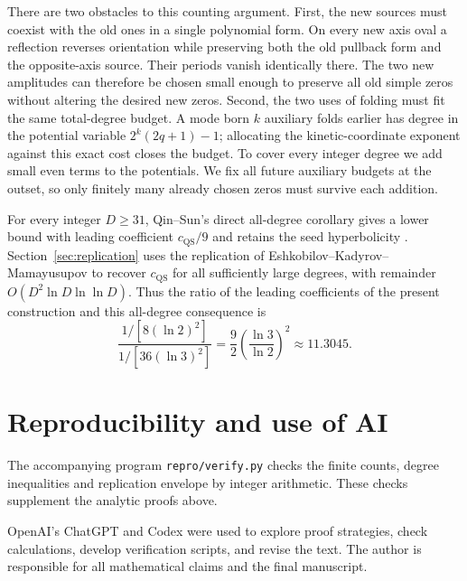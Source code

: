 \documentclass[11pt]{article}
\numberwithin{equation}{section}
\theoremstyle{definition}
\theoremstyle{remark}
\begin{document}
There are two obstacles to this counting argument. First, the new sources
must coexist with the old ones in a single polynomial form. On every
new axis oval a reflection reverses orientation while preserving both
the old pullback form and the opposite-axis source. Their periods vanish
identically there. The two new amplitudes can therefore be chosen small
enough to preserve all old simple zeros without altering the desired new
zeros. Second, the two uses of folding must fit the same total-degree
budget. A mode born $k$ auxiliary folds earlier has degree in the potential variable
$2^k(2q+1)-1$; allocating the kinetic-coordinate exponent against this exact cost
closes the budget. To cover every integer degree we add small even
terms to the potentials. We fix all future auxiliary budgets at the
outset, so only finitely many already chosen zeros must survive each
addition.

For every integer $D\ge31$, Qin--Sun's direct all-degree corollary gives
a lower bound with leading coefficient $c_{\mathrm{QS}}/9$ and retains
the seed hyperbolicity
\cite[Corollary~1.2 and Sections~6.2, 6.4]{QinSun2026}. Section~\ref{sec:replication}
uses the replication of Eshkobilov--Kadyrov--Mamayusupov \cite{EKM2026}
to recover $c_{\mathrm{QS}}$ for all sufficiently large degrees, with
remainder $O(D^2\ln D\ln\ln D)$. Thus the ratio of the leading
coefficients of the present construction and this all-degree consequence is
\[
 \frac{1/[8(\ln2)^2]}{1/[36(\ln3)^2]}
 =\frac92\left(\frac{\ln3}{\ln2}\right)^2\approx11.3045.
\]







\section*{Reproducibility and use of AI}

The accompanying program \texttt{repro/verify.py} checks the finite
counts, degree inequalities and replication envelope by integer
arithmetic. These checks supplement the analytic proofs above.

OpenAI's ChatGPT and Codex were used to explore proof strategies,
check calculations, develop verification scripts, and revise the text.
The author is responsible for all mathematical claims and the final
manuscript.



\end{document}
